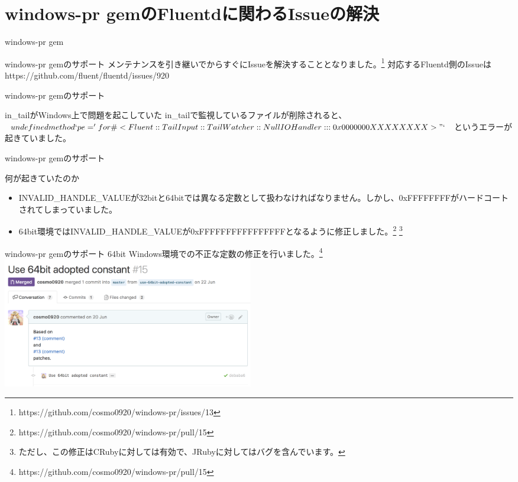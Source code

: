 \documentclass[12pt, unicode]{beamer}
\begin{document}
\section[]{windows-pr gemのFluentdに関わるIssueの解決}
\begin{frame}{windows-pr gem}
  \begin{block}{windows-pr gemのサポート}
メンテナンスを引き継いでからすぐにIssueを解決することとなりました。\footnote[frame]{https://github.com/cosmo0920/windows-pr/issues/13}\newline
対応するFluentd側のIssueは https://github.com/fluent/fluentd/issues/920
  \end{block}
\end{frame}

\begin{frame}{windows-pr gemのサポート}
  \begin{block}{in\_tailがWindows上で問題を起こしていた}
    in\_tailで監視しているファイルが削除されると、\newline
    $undefined method `pe=' for \#<Fluent::TailInput::TailWatcher::NullIOHandler:::0x0000000XXXXXXXX>"`$
    というエラーが起きていました。
  \end{block}
\end{frame}

\begin{frame}{windows-pr gemのサポート}
  \begin{block}{何が起きていたのか}
    \begin{itemize}
    \item INVALID\_HANDLE\_VALUEが32bitと64bitでは異なる定数として扱わなければなりません。しかし、0xFFFFFFFFがハードコートされてしまっていました。
    \item 64bit環境ではINVALID\_HANDLE\_VALUEが0xFFFFFFFFFFFFFFFFとなるように修正しました。\footnote[frame]{https://github.com/cosmo0920/windows-pr/pull/15} \footnote[frame]{ただし、この修正はCRubyに対しては有効で、JRubyに対してはバグを含んでいます。}
    \end{itemize}
  \end{block}
\end{frame}

\begin{frame}{windows-pr gemのサポート}
  64bit Windows環境での不正な定数の修正を行いました。\footnote[frame]{https://github.com/cosmo0920/windows-pr/pull/15}
  \includegraphics[clip,width=11cm]{images/fixes-invalid-constant-in-64bit-windows-pr.png}
\end{frame}
\end{document}
